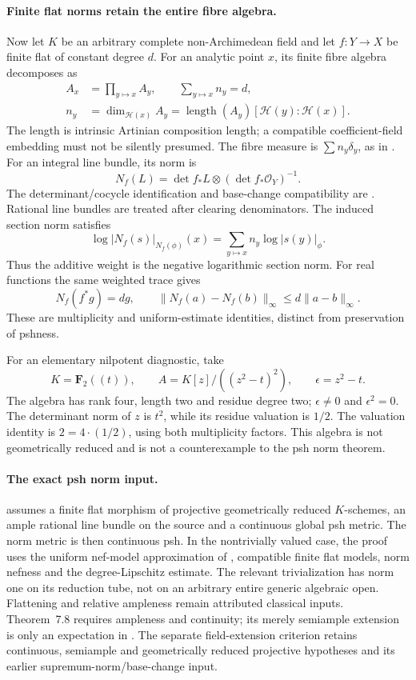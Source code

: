 \paragraph{Finite flat norms retain the entire fibre algebra.}
Now let \(K\) be an arbitrary complete non-Archimedean field and
let \(f:Y\to X\) be finite flat of constant degree \(d\).
For an analytic point \(x\), its finite fibre algebra decomposes as
\[
 \begin{aligned}
 A_x&=\prod_{y\mapsto x}A_y,\qquad
       \sum_{y\mapsto x}n_y=d,\\
 n_y&=\dim_{\mathcal H(x)}A_y
     =\operatorname{length}(A_y)
        [\mathcal H(y):\mathcal H(x)].
 \end{aligned}
\]
The length is intrinsic Artinian composition length; a compatible
coefficient-field embedding must not be silently presumed.
The fibre measure is \(\sum n_y\delta_y\), as in
\cite[Example~8.2]{BE21}. For an integral line bundle, its norm is
\[
 N_f(L)=\det f_*L\otimes(\det f_*\mathcal O_Y)^{-1}.
\]
The determinant/cocycle identification and base-change compatibility
are \cite[Lemmas~A.19--A.20]{BE21}. Rational line bundles are treated
after clearing denominators. The induced section norm satisfies \cite[Equation~(8.17)]{BE21}
\[
 \log|N_f(s)|_{N_f(\phi)}(x)
 =\sum_{y\mapsto x}n_y\log|s(y)|_\phi.
\]
Thus the additive weight is the negative logarithmic section norm.
For real functions the same weighted trace gives
\[
 N_f(f^*g)=dg,\qquad
 \|N_f(a)-N_f(b)\|_\infty\leq d\|a-b\|_\infty.
\]
These are multiplicity and uniform-estimate identities, distinct
from preservation of pshness.

For an elementary nilpotent diagnostic, take
\[
 K=\mathbf F_2((t)),\qquad
 A=K[z]/((z^2-t)^2),\qquad \epsilon=z^2-t.
\]
The algebra has rank four, length two and residue degree two;
\(\epsilon\ne0\) and \(\epsilon^2=0\). The determinant norm of
\(z\) is \(t^2\), while its residue valuation is \(1/2\).
The valuation identity is \(2=4\cdot(1/2)\), using both
multiplicity factors. This algebra is not geometrically reduced
and is not a counterexample to the psh norm theorem.

\paragraph{The exact psh norm input.}
\cite[Proposition~8.22]{BE21} assumes a finite flat morphism of
projective geometrically reduced \(K\)-schemes, an ample rational
line bundle on the source and a continuous global psh metric.
The norm metric is then continuous psh.
In the nontrivially valued case, the proof uses the uniform
nef-model approximation of \cite[Theorem~7.8]{BE21}, compatible
finite flat models, norm nefness and the degree-Lipschitz estimate.
The relevant trivialization has norm one on its reduction tube,
not on an arbitrary entire generic algebraic open.
Flattening and relative ampleness remain attributed classical inputs.
Theorem~7.8 requires ampleness and continuity; its merely semiample
extension is only an expectation in \cite[Remark~7.10]{BE21}.
The separate field-extension criterion
\cite[Theorem~7.31]{BE21} retains continuous, semiample and
geometrically reduced projective hypotheses and its earlier
supremum-norm/base-change input.

